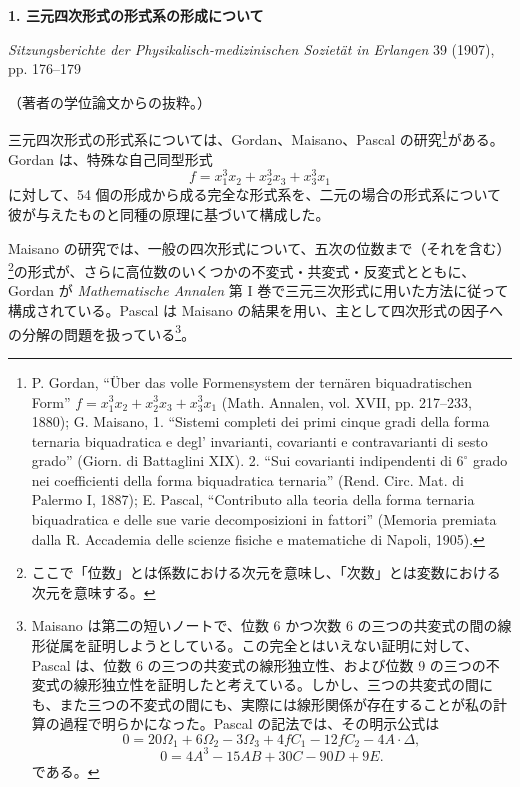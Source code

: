 \documentclass[11pt]{jlreq}
\begin{document}
\begin{center}
{\Large\bfseries 1. 三元四次形式の形式系の形成について}\par
\vspace{1.5em}
\emph{Sitzungsberichte der Physikalisch-medizinischen Sozietät in Erlangen} 39 (1907), pp. 176--179
\end{center}

\vspace{3em}
\begin{center}
（著者の学位論文からの抜粋。）
\end{center}

三元四次形式の形式系については、Gordan、Maisano、Pascal の研究\footnote{P. Gordan, ``Über das volle Formensystem der ternären biquadratischen Form'' \(f=x_1^3x_2+x_2^3x_3+x_3^3x_1\) (Math. Annalen, vol. XVII, pp. 217--233, 1880); G. Maisano, 1. ``Sistemi completi dei primi cinque gradi della forma ternaria biquadratica e degl' invarianti, covarianti e contravarianti di sesto grado'' (Giorn. di Battaglini XIX). 2. ``Sui covarianti indipendenti di \(6^\circ\) grado nei coefficienti della forma biquadratica ternaria'' (Rend. Circ. Mat. di Palermo I, 1887); E. Pascal, ``Contributo alla teoria della forma ternaria biquadratica e delle sue varie decomposizioni in fattori'' (Memoria premiata dalla R. Accademia delle scienze fisiche e matematiche di Napoli, 1905).}がある。Gordan は、特殊な自己同型形式
\[
f=x_1^3x_2+x_2^3x_3+x_3^3x_1
\]
に対して、54 個の形成から成る完全な形式系を、二元の場合の形式系について彼が与えたものと同種の原理に基づいて構成した。

Maisano の研究では、一般の四次形式について、五次の位数まで（それを含む）\footnote{ここで「位数」とは係数における次元を意味し、「次数」とは変数における次元を意味する。}の形式が、さらに高位数のいくつかの不変式・共変式・反変式とともに、Gordan が \emph{Mathematische Annalen} 第 I 巻で三元三次形式に用いた方法に従って構成されている。Pascal は Maisano の結果を用い、主として四次形式の因子への分解の問題を扱っている\footnote{Maisano は第二の短いノートで、位数 6 かつ次数 6 の三つの共変式の間の線形従属を証明しようとしている。この完全とはいえない証明に対して、Pascal は、位数 6 の三つの共変式の線形独立性、および位数 9 の三つの不変式の線形独立性を証明したと考えている。しかし、三つの共変式の間にも、また三つの不変式の間にも、実際には線形関係が存在することが私の計算の過程で明らかになった。Pascal の記法では、その明示公式は
\[
0=20\Omega_1+6\Omega_2-3\Omega_3+4fC_1-12fC_2-4A\cdot\Delta,
\]
\[
0=4A^3-15AB+30C-90D+9E.
\]
である。}。
\end{document}

